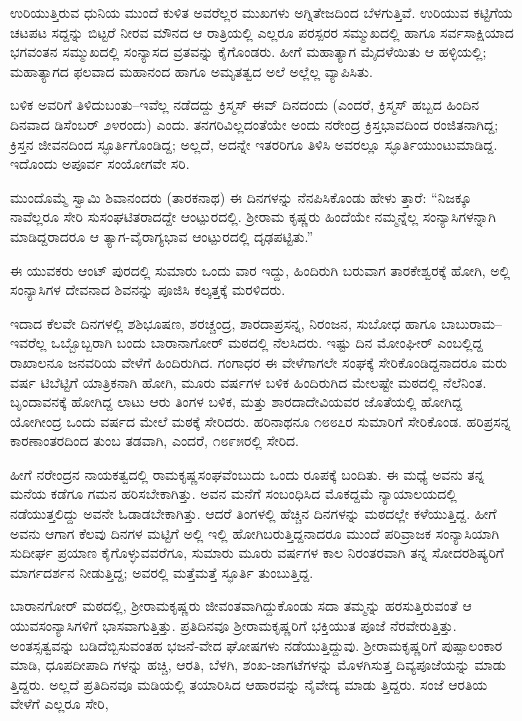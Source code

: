 ಉರಿಯುತ್ತಿರುವ ಧುನಿಯ ಮುಂದೆ ಕುಳಿತ ಅವರೆಲ್ಲರ ಮುಖಗಳು ಅಗ್ನಿತೇಜದಿಂದ ಬೆಳಗುತ್ತಿವೆ. ಉರಿಯುವ ಕಟ್ಟಿಗೆಯ ಚಟಪಟ ಸದ್ದನ್ನು ಬಿಟ್ಟರೆ ನೀರವ ಮೌನದ ಆ ರಾತ್ರಿಯಲ್ಲಿ ಎಲ್ಲರೂ ಪರಸ್ಪರರ ಸಮ್ಮುಖದಲ್ಲಿ ಹಾಗೂ ಸರ್ವಸಾಕ್ಷಿಯಾದ ಭಗವಂತನ ಸಮ್ಮುಖದಲ್ಲಿ ಸಂನ್ಯಾಸದ ವ್ರತವನ್ನು ಕೈಗೊಂಡರು. ಹೀಗೆ ಮಹಾತ್ಯಾಗ ಮೈದಳೆಯಿತು ಆ ಹಳ್ಳಿಯಲ್ಲಿ; ಮಹಾತ್ಯಾಗದ ಫಲವಾದ ಮಹಾನಂದ ಹಾಗೂ ಅಮೃತತ್ವದ ಅಲೆ ಅಲ್ಲೆಲ್ಲ ವ್ಯಾಪಿಸಿತು.

ಬಳಿಕ ಅವರಿಗೆ ತಿಳಿದುಬಂತು–ಇವೆಲ್ಲ ನಡೆದದ್ದು ಕ್ರಿಸ್ಮಸ್ ಈವ್ ದಿನದಂದು (ಎಂದರೆ, ಕ್ರಿಸ್ಮಸ್ ಹಬ್ಬದ ಹಿಂದಿನ ದಿನವಾದ ಡಿಸೆಂಬರ್ ೨೪ರಂದು) ಎಂದು. ತನಗರಿವಿಲ್ಲದಂತೆಯೇ ಅಂದು ನರೇಂದ್ರ ಕ್ರಿಸ್ತಭಾವದಿಂದ ರಂಜಿತನಾಗಿದ್ದ; ಕ್ರಿಸ್ತನ ಜೀವನದಿಂದ ಸ್ಫೂರ್ತಿಗೊಂಡಿದ್ದ; ಅಲ್ಲದೆ, ಅದನ್ನೇ ಇತರರಿಗೂ ತಿಳಿಸಿ ಅವರಲ್ಲೂ ಸ್ಫೂರ್ತಿಯುಂಟುಮಾಡಿದ್ದ. ಇದೊಂದು ಅಪೂರ್ವ ಸಂಯೋಗವೇ ಸರಿ.

ಮುಂದೊಮ್ಮೆ ಸ್ವಾಮಿ ಶಿವಾನಂದರು (ತಾರಕನಾಥ) ಈ ದಿನಗಳನ್ನು ನೆನಪಿಸಿಕೊಂಡು ಹೇಳು ತ್ತಾರೆ: “ನಿಜಕ್ಕೂ ನಾವೆಲ್ಲರೂ ಸೇರಿ ಸುಸಂಘಟಿತರಾದದ್ದೇ ಆಂಟ್ಪುರದಲ್ಲಿ. ಶ್ರೀರಾಮ ಕೃಷ್ಣರು ಹಿಂದೆಯೇ ನಮ್ಮನ್ನೆಲ್ಲ ಸಂನ್ಯಾಸಿಗಳನ್ನಾಗಿ ಮಾಡಿದ್ದರಾದರೂ ಆ ತ್ಯಾಗ-ವೈರಾಗ್ಯಭಾವ ಆಂಟ್ಪುರದಲ್ಲಿ ದೃಢಪಟ್ಟಿತು.”

ಈ ಯುವಕರು ಆಂಟ್ ಪುರದಲ್ಲಿ ಸುಮಾರು ಒಂದು ವಾರ ಇದ್ದು, ಹಿಂದಿರುಗಿ ಬರುವಾಗ ತಾರಕೇಶ್ವರಕ್ಕೆ ಹೋಗಿ, ಅಲ್ಲಿ ಸಂನ್ಯಾಸಿಗಳ ದೇವನಾದ ಶಿವನನ್ನು ಪೂಜಿಸಿ ಕಲ್ಕತ್ತಕ್ಕೆ ಮರಳಿದರು.

ಇದಾದ ಕೆಲವೇ ದಿನಗಳಲ್ಲಿ ಶಶಿಭೂಷಣ, ಶರಚ್ಚಂದ್ರ, ಶಾರದಾಪ್ರಸನ್ನ, ನಿರಂಜನ, ಸುಬೋಧ ಹಾಗೂ ಬಾಬುರಾಮ–ಇವರೆಲ್ಲ ಒಬ್ಬೊಬ್ಬರಾಗಿ ಬಂದು ಬಾರಾನಾಗೋರ್ ಮಠದಲ್ಲಿ ನೆಲಸಿದರು. ಇಷ್ಟು ದಿನ ಮೋಂಘೀರ್ ಎಂಬಲ್ಲಿದ್ದ ರಾಖಾಲನೂ ಜನವರಿಯ ವೇಳೆಗೆ ಹಿಂದಿರುಗಿದ. ಗಂಗಾಧರ ಈ ವೇಳೆಗಾಗಲೇ ಸಂಘಕ್ಕೆ ಸೇರಿಕೊಂಡಿದ್ದನಾದರೂ ಮರು ವರ್ಷ ಟಿಬೆಟ್ಟಿಗೆ ಯಾತ್ರಿಕನಾಗಿ ಹೋಗಿ, ಮೂರು ವರ್ಷಗಳ ಬಳಿಕ ಹಿಂದಿರುಗಿದ ಮೇಲಷ್ಟೇ ಮಠದಲ್ಲಿ ನೆಲೆನಿಂತ. ಬೃಂದಾವನಕ್ಕೆ ಹೋಗಿದ್ದ ಲಾಟು ಆರು ತಿಂಗಳ ಬಳಿಕ, ಮತ್ತು ಶಾರದಾದೇವಿಯವರ ಜೊತೆಯಲ್ಲಿ ಹೋಗಿದ್ದ ಯೋಗೀಂದ್ರ ಒಂದು ವರ್ಷದ ಮೇಲೆ ಮಠಕ್ಕೆ ಸೇರಿದರು. ಹರಿನಾಥನೂ ೧೮೮೭ರ ಸುಮಾರಿಗೆ ಸೇರಿಕೊಂಡ. ಹರಿಪ್ರಸನ್ನ ಕಾರಣಾಂತರದಿಂದ ತುಂಬ ತಡವಾಗಿ, ಎಂದರೆ, ೧೮೯೫ರಲ್ಲಿ ಸೇರಿದ.

ಹೀಗೆ ನರೇಂದ್ರನ ನಾಯಕತ್ವದಲ್ಲಿ ರಾಮಕೃಷ್ಣಸಂಘವೆಂಬುದು ಒಂದು ರೂಪಕ್ಕೆ ಬಂದಿತು. ಈ ಮಧ್ಯೆ ಅವನು ತನ್ನ ಮನೆಯ ಕಡೆಗೂ ಗಮನ ಹರಿಸಬೇಕಾಗಿತ್ತು. ಅವನ ಮನೆಗೆ ಸಂಬಂಧಿಸಿದ ಮೊಕದ್ದಮೆ ನ್ಯಾಯಾಲಯದಲ್ಲಿ ನಡೆಯುತ್ತಲಿದ್ದು ಅವನೇ ಓಡಾಡಬೇಕಾಗಿತ್ತು. ಆದರೆ ತಿಂಗಳಲ್ಲಿ ಹೆಚ್ಚಿನ ದಿನಗಳನ್ನು ಮಠದಲ್ಲೇ ಕಳೆಯುತ್ತಿದ್ದ. ಹೀಗೆ ಅವನು ಆಗಾಗ ಕೆಲವು ದಿನಗಳ ಮಟ್ಟಿಗೆ ಅಲ್ಲಿ ಇಲ್ಲಿ ಹೋಗಿಬರುತ್ತಿದ್ದನಾದರೂ ಮುಂದೆ ಪರಿವ್ರಾಜಕ ಸಂನ್ಯಾಸಿಯಾಗಿ ಸುದೀರ್ಘ ಪ್ರಯಾಣ ಕೈಗೊಳ್ಳುವವರೆಗೂ, ಸುಮಾರು ಮೂರು ವರ್ಷಗಳ ಕಾಲ ನಿರಂತರವಾಗಿ ತನ್ನ ಸೋದರಶಿಷ್ಯರಿಗೆ ಮಾರ್ಗದರ್ಶನ ನೀಡುತ್ತಿದ್ದ; ಅವರಲ್ಲಿ ಮತ್ತೆಮತ್ತೆ ಸ್ಫೂರ್ತಿ ತುಂಬುತ್ತಿದ್ದ.

ಬಾರಾನಗೋರ್ ಮಠದಲ್ಲಿ, ಶ್ರೀರಾಮಕೃಷ್ಣರು ಜೀವಂತವಾಗಿದ್ದುಕೊಂಡು ಸದಾ ತಮ್ಮನ್ನು ಹರಸುತ್ತಿರುವಂತೆ ಆ ಯುವಸಂನ್ಯಾಸಿಗಳಿಗೆ ಭಾಸವಾಗುತ್ತಿತ್ತು. ಪ್ರತಿದಿನವೂ ಶ್ರೀರಾಮಕೃಷ್ಣರಿಗೆ ಭಕ್ತಿಯುತ ಪೂಜೆ ನೆರವೇರುತ್ತಿತ್ತು. ಅಂತಸ್ಸತ್ವವನ್ನು ಬಡಿದೆಬ್ಬಿಸುವಂತಹ ಭಜನೆ-ವೇದ ಘೋಷಗಳು ನಡೆಯುತ್ತಿದ್ದುವು. ಶ್ರೀರಾಮಕೃಷ್ಣರಿಗೆ ಪುಷ್ಪಾಲಂಕಾರ ಮಾಡಿ, ಧೂಪದೀಪಾದಿ ಗಳನ್ನು ಹಚ್ಚಿ, ಆರತಿ, ಬೆಳಗಿ, ಶಂಖ-ಜಾಗಟೆಗಳನ್ನು ಮೊಳಗಿಸುತ್ತ ದಿವ್ಯಪೂಜೆಯನ್ನು ಮಾಡು ತ್ತಿದ್ದರು. ಅಲ್ಲದೆ ಪ್ರತಿದಿನವೂ ಮಡಿಯಲ್ಲಿ ತಯಾರಿಸಿದ ಆಹಾರವನ್ನು ನೈವೇದ್ಯ ಮಾಡು ತ್ತಿದ್ದರು. ಸಂಜೆ ಆರತಿಯ ವೇಳೆಗೆ ಎಲ್ಲರೂ ಸೇರಿ,

